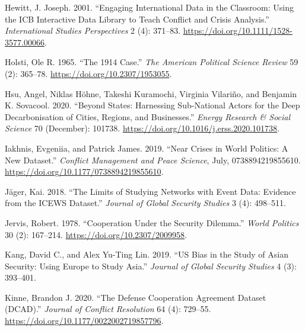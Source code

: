 \documentclass{article}
\newlength{\cslhangindent}
\newlength{\cslentryspacingunit} %
\newenvironment{CSLReferences}[2] %
 {%
  \setlength{\parindent}{0pt}
  \ifodd #1
  \let\oldpar\par
  \def\par{\hangindent=\cslhangindent\oldpar}
  \fi
  \setlength{\parskip}{#2\cslentryspacingunit}
 }%
 {}
\begin{document}
\begin{CSLReferences}{1}{0}
\leavevmode{}%
Hewitt, J. Joseph. 2001. {``Engaging {International Data} in the
{Classroom}: {Using} the {ICB Interactive Data Library} to {Teach
Conflict} and {Crisis Analysis}.''} \emph{International Studies
Perspectives} 2 (4): 371--83.
\url{https://doi.org/10.1111/1528-3577.00066}.

\leavevmode{}%
Holsti, Ole R. 1965. {``The 1914 {Case}.''} \emph{The American Political
Science Review} 59 (2): 365--78. \url{https://doi.org/10.2307/1953055}.

\leavevmode{}%
Hsu, Angel, Niklas Höhne, Takeshi Kuramochi, Virginia Vilariño, and
Benjamin K. Sovacool. 2020. {``Beyond States: {Harnessing} Sub-National
Actors for the Deep Decarbonisation of Cities, Regions, and
Businesses.''} \emph{Energy Research \& Social Science} 70 (December):
101738. \url{https://doi.org/10.1016/j.erss.2020.101738}.

\leavevmode{}%
Iakhnis, Evgeniia, and Patrick James. 2019. {``Near Crises in World
Politics: {A} New Dataset.''} \emph{Conflict Management and Peace
Science}, July, 0738894219855610.
\url{https://doi.org/10.1177/0738894219855610}.

\leavevmode{}%
Jäger, Kai. 2018. {``The {Limits} of {Studying Networks} with {Event
Data}: {Evidence} from the {ICEWS Dataset}.''} \emph{Journal of Global
Security Studies} 3 (4): 498--511.

\leavevmode{}%
Jervis, Robert. 1978. {``Cooperation {Under} the {Security Dilemma}.''}
\emph{World Politics} 30 (2): 167--214.
\url{https://doi.org/10.2307/2009958}.

\leavevmode{}%
Kang, David C., and Alex Yu-Ting Lin. 2019. {``{US} Bias in the Study of
{Asian} Security: {Using Europe} to Study {Asia}.''} \emph{Journal of
Global Security Studies} 4 (3): 393--401.

\leavevmode{}%
Kinne, Brandon J. 2020. {``The {Defense Cooperation Agreement Dataset}
({DCAD}).''} \emph{Journal of Conflict Resolution} 64 (4): 729--55.
\url{https://doi.org/10.1177/0022002719857796}.


\end{CSLReferences}
\end{document}
